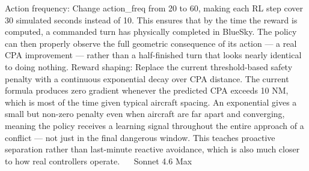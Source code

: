 Action frequency: Change action_freq from 20 to 60, making each RL step cover 30 simulated seconds instead of 10. This ensures that by the time the reward is computed, a commanded turn has physically completed in BlueSky. The policy can then properly observe the full geometric consequence of its action — a real CPA improvement — rather than a half-finished turn that looks nearly identical to doing nothing.
Reward shaping: Replace the current threshold-based safety penalty with a continuous exponential decay over CPA distance. The current formula produces zero gradient whenever the predicted CPA exceeds 10 NM, which is most of the time given typical aircraft spacing. An exponential gives a small but non-zero penalty even when aircraft are far apart and converging, meaning the policy receives a learning signal throughout the entire approach of a conflict — not just in the final dangerous window. This teaches proactive separation rather than last-minute reactive avoidance, which is also much closer to how real controllers operate.Sonnet 4.6 Max